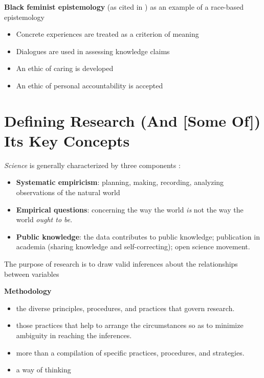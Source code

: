 \documentclass[
  english,
]{book}
\providecommand{\tightlist}{%
  \setlength{\itemsep}{0pt}\setlength{\parskip}{0pt}}
\begin{document}
\textbf{Black feminist epistemology} (as cited in \citep{hill_collins_black_2000}) as an example of a race-based epistemology

\begin{itemize}
\tightlist
\item
  Concrete experiences are treated as a criterion of meaning
\item
  Dialogues are used in assessing knowledge claims
\item
  An ethic of caring is developed
\item
  An ethic of personal accountability is accepted
\end{itemize}

\hypertarget{defining-research-and-some-of-its-key-concepts}{%
\section{Defining Research (And {[}Some Of{]}) Its Key Concepts}\label{defining-research-and-some-of-its-key-concepts}}

\emph{Science} is generally characterized by three components \citep{jhangiani_research_2019}:

\begin{itemize}
\tightlist
\item
  \textbf{Systematic empiricism}: planning, making, recording, analyzing observations of the natural world
\item
  \textbf{Empirical questions}: concerning the way the world \emph{is} not the way the world \emph{ought to be}.
\item
  \textbf{Public knowledge}: the data contributes to public knowledge; publication in academia (sharing knowledge and self-correcting); open science movement.
\end{itemize}

The purpose of research is to draw valid inferences about the relationships between variables \citep{kazdin_research_2017}

\textbf{Methodology}

\begin{itemize}
\tightlist
\item
  the diverse principles, procedures, and practices that govern research.
\item
  those practices that help to arrange the circumstances so as to minimize ambiguity in reaching the inferences.
\item
  more than a compilation of specific practices, procedures, and strategies.
\item
  a way of thinking
\end{itemize}
\end{document}

